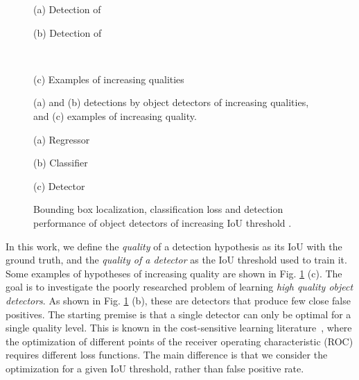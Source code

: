 \documentclass[10pt,journal,compsoc]{IEEEtran}
\begin{document}
\begin{figure}[!t]
\begin{minipage}[b]{.495\linewidth}
\centering
\centerline{}{(a) Detection of }
\end{minipage}
\hfill
\begin{minipage}[b]{.495\linewidth}
\centering
\centerline{}{(b) Detection of }
\end{minipage}\\\vspace{2mm}
\begin{minipage}[b]{.99\linewidth}
\centering
\centerline{}{(c) Examples of increasing qualities}
\end{minipage}
\caption{(a) and (b) detections by object detectors of increasing qualities, and (c) examples of increasing quality.}
\label{fig:quality detection}
\end{figure}

\begin{figure*}[!t]
\begin{minipage}[b]{.33\linewidth}
\centering
\centerline{}{(a) Regressor}
\end{minipage}
\hfill
\begin{minipage}[b]{.33\linewidth}
\centering
\centerline{}{(b) Classifier}
\end{minipage}
\hfill
\begin{minipage}[b]{.33\linewidth}
\centering
\centerline{}{(c) Detector}
\end{minipage}
\caption{Bounding box localization, classification loss and detection performance of object detectors of increasing IoU threshold .}
\label{fig:motivation}
\end{figure*}

In this work, we define the {\it quality\/} of a detection hypothesis as its
IoU with the ground truth, and the {\it quality of a detector\/} as the IoU
threshold  used to train it. Some examples of hypotheses of increasing
quality are shown in  Fig. \ref{fig:quality detection} (c). The goal
is to investigate the poorly researched problem of learning
{\it high quality object detectors\/}. As shown in Fig.
\ref{fig:quality detection} (b), these are detectors that produce few close
false positives.
The starting premise is that a single detector can only be optimal for a
single quality level. This is known in the
cost-sensitive learning literature~\cite{DBLP:conf/ijcai/Elkan01,
DBLP:journals/pami/Masnadi-ShiraziV11}, where the optimization of
different points of the receiver operating characteristic (ROC) requires
different loss functions. The main difference is that we consider
the optimization for a given IoU threshold, rather than false positive rate.
\end{document}
